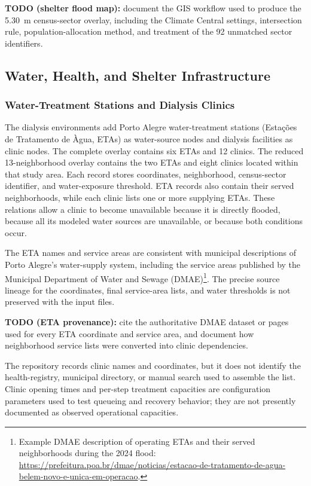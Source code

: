 {\color{red}\textbf{TODO (shelter flood map):} document the GIS workflow used to produce the 5.30~m census-sector overlay, including the Climate Central settings, intersection rule, population-allocation method, and treatment of the 92 unmatched sector identifiers.}

\subsection{Water, Health, and Shelter Infrastructure}
\label{sec:infrastructure_input_data}

\subsubsection{Water-Treatment Stations and Dialysis Clinics}

The dialysis environments add Porto Alegre water-treatment stations (Esta\c{c}\~oes de Tratamento de \`Agua, ETAs) as water-source nodes and dialysis facilities as clinic nodes. The complete overlay contains six ETAs and 12 clinics. The reduced 13-neighborhood overlay contains the two ETAs and eight clinics located within that study area. Each record stores coordinates, neighborhood, census-sector identifier, and water-exposure threshold. ETA records also contain their served neighborhoods, while each clinic lists one or more supplying ETAs. These relations allow a clinic to become unavailable because it is directly flooded, because all its modeled water sources are unavailable, or because both conditions occur.

The ETA names and service areas are consistent with municipal descriptions of Porto Alegre's water-supply system, including the service areas published by the Municipal Department of Water and Sewage (DMAE)\footnote{Example DMAE description of operating ETAs and their served neighborhoods during the 2024 flood: \url{https://prefeitura.poa.br/dmae/noticias/estacao-de-tratamento-de-agua-belem-novo-e-unica-em-operacao}.}. The precise source lineage for the coordinates, final service-area lists, and water thresholds is not preserved with the input files.

{\color{red}\textbf{TODO (ETA provenance):} cite the authoritative DMAE dataset or pages used for every ETA coordinate and service area, and document how neighborhood service lists were converted into clinic dependencies.}

The repository records clinic names and coordinates, but it does not identify the health-registry, municipal directory, or manual search used to assemble the list. Clinic opening times and per-step treatment capacities are configuration parameters used to test queueing and recovery behavior; they are not presently documented as observed operational capacities.

